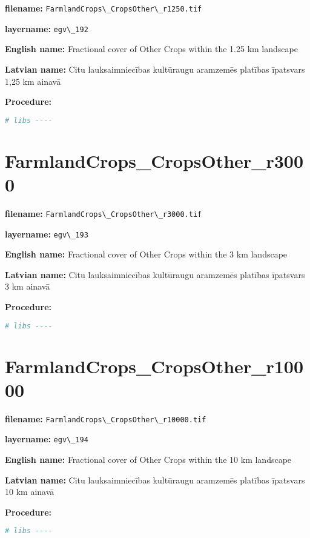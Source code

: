 \documentclass[
]{book}
\newcommand{\passthrough}[1]{#1}
\begin{document}
\textbf{filename:} \passthrough{\lstinline!FarmlandCrops\_CropsOther\_r1250.tif!}

\textbf{layername:} \passthrough{\lstinline!egv\_192!}

\textbf{English name:} Fractional cover of Other Crops within the 1.25 km landscape

\textbf{Latvian name:} Citu lauksaimniecības kultūraugu aramzemēs platības īpatsvars 1,25 km ainavā

\textbf{Procedure:}

\begin{lstlisting}[language=R]
# libs ----
\end{lstlisting}

\section{FarmlandCrops\_CropsOther\_r3000}\label{ch06.193}

\textbf{filename:} \passthrough{\lstinline!FarmlandCrops\_CropsOther\_r3000.tif!}

\textbf{layername:} \passthrough{\lstinline!egv\_193!}

\textbf{English name:} Fractional cover of Other Crops within the 3 km landscape

\textbf{Latvian name:} Citu lauksaimniecības kultūraugu aramzemēs platības īpatsvars 3 km ainavā

\textbf{Procedure:}

\begin{lstlisting}[language=R]
# libs ----
\end{lstlisting}

\section{FarmlandCrops\_CropsOther\_r10000}\label{ch06.194}

\textbf{filename:} \passthrough{\lstinline!FarmlandCrops\_CropsOther\_r10000.tif!}

\textbf{layername:} \passthrough{\lstinline!egv\_194!}

\textbf{English name:} Fractional cover of Other Crops within the 10 km landscape

\textbf{Latvian name:} Citu lauksaimniecības kultūraugu aramzemēs platības īpatsvars 10 km ainavā

\textbf{Procedure:}

\begin{lstlisting}[language=R]
# libs ----
\end{lstlisting}
\end{document}
